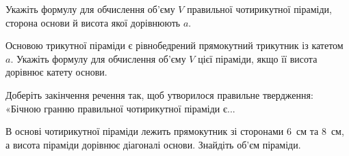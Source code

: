 \documentclass[12pt]{article}
\begin{document}
\begin{samepage}
\noindent\zadnum Укажіть формулу для обчислення об’єму $V$ правильної чотирикутної піраміди, сторона основи й висота якої дорівнюють $a$. 

\nmtnobreak
\nopagebreak\nbvspace{0.3cm}
\par{}
\end{samepage}

\begin{samepage}
\noindent\zadnum Основою трикутної піраміди є рівнобедрений прямокутний трикутник із катетом $a$. Укажіть формулу для обчислення об’єму $V$ цієї піраміди, якщо її висота дорівнює катету основи. 

\nmtnobreak
\nopagebreak\nbvspace{0.3cm}
\par{}
\end{samepage}

\begin{samepage}
\noindent\zadnum Доберіть закінчення речення так, щоб утворилося правильне твердження: «Бічною гранню правильної чотирикутної піраміди є... 

\nmtnobreak
\nopagebreak\nbvspace{0.3cm}
\noindent
{}


\nmtnobreak
\nopagebreak\nbvspace{0.5cm}
\par{}\vspace{0.25cm}
\end{samepage}

\begin{samepage}
\noindent\zadnum В основі чотирикутної піраміди лежить прямокутник зі сторонами 6~см та 8~см, а висота піраміди дорівнює діагоналі основи. Знайдіть об’єм піраміди. 

\nmtnobreak
\nopagebreak\nbvspace{0.3cm}
\par{}
\end{samepage}
\end{document}
